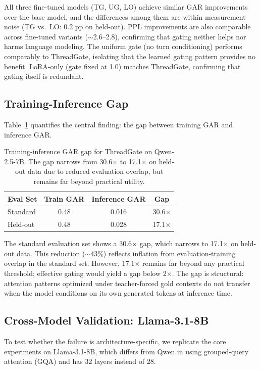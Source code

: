 \documentclass[11pt,a4paper]{article}
\begin{document}
All three fine-tuned models (TG, UG, LO) achieve similar GAR improvements over the base model, and the differences among them are within measurement noise (TG vs.\ LO: 0.2 pp on held-out).
PPL improvements are also comparable across fine-tuned variants ($\sim$2.6--2.8), confirming that gating neither helps nor harms language modeling.
The uniform gate (no turn conditioning) performs comparably to ThreadGate, isolating that the learned gating pattern provides no benefit.
LoRA-only (gate fixed at 1.0) matches ThreadGate, confirming that gating itself is redundant.

\subsection{Training-Inference Gap}

Table~\ref{tab:gap} quantifies the central finding: the gap between training GAR and inference GAR.

\begin{table}[t]
\centering
\caption{Training-inference GAR gap for ThreadGate on Qwen-2.5-7B. The gap narrows from 30.6$\times$ to 17.1$\times$ on held-out data due to reduced evaluation overlap, but remains far beyond practical utility.}
\label{tab:gap}
\begin{tabular}{lccc}
\toprule
\textbf{Eval Set} & \textbf{Train GAR} & \textbf{Inference GAR} & \textbf{Gap} \\
\midrule
Standard & 0.48 & 0.016 & 30.6$\times$ \\
Held-out & 0.48 & 0.028 & 17.1$\times$ \\
\bottomrule
\end{tabular}
\end{table}

The standard evaluation set shows a 30.6$\times$ gap, which narrows to 17.1$\times$ on held-out data. This reduction ($\sim$43\%) reflects inflation from evaluation-training overlap in the standard set.
However, 17.1$\times$ remains far beyond any practical threshold; effective gating would yield a gap below 2$\times$.
The gap is structural: attention patterns optimized under teacher-forced gold contexts do not transfer when the model conditions on its own generated tokens at inference time.

\subsection{Cross-Model Validation: Llama-3.1-8B}

To test whether the failure is architecture-specific, we replicate the core experiments on Llama-3.1-8B, which differs from Qwen in using grouped-query attention (GQA) and has 32 layers instead of 28.
\end{document}
